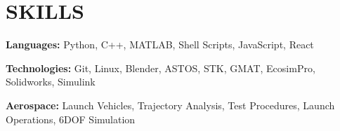 
\section{SKILLS}   

\begin{onecolentry}
\textbf{Languages:} Python, C++, MATLAB, Shell Scripts, JavaScript, React
\end{onecolentry}

\begin{onecolentry}
\textbf{Technologies:} Git, Linux, Blender, ASTOS, STK, GMAT, EcosimPro, Solidworks, Simulink
\end{onecolentry}

\begin{onecolentry}
\textbf{Aerospace:} Launch Vehicles, Trajectory Analysis, Test Procedures, Launch Operations, 6DOF Simulation
\end{onecolentry}
